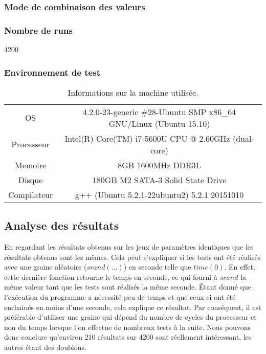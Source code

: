 \subsubsection{Mode de combinaison des valeurs}

\subsubsection{Nombre de runs}
4200
\subsubsection{Environnement de test}
\begin{table}[h!]
	\centering
	\caption{Informations sur la machine utilisée.}
	\label{tab:table1}
	\begin{tabular}{c|c}
		\toprule
		OS & 4.2.0-23-generic \#28-Ubuntu SMP x86\_64 GNU/Linux (Ubuntu 15.10)\\
		Processeur & Intel(R) Core(TM) i7-5600U CPU @ 2.60GHz (dual-core)\\
		Memoire & 8GB 1600MHz DDR3L\\
		Disque & 180GB M2 SATA-3 Solid State Drive\\
		Compilateur & g++ (Ubuntu 5.2.1-22ubuntu2) 5.2.1 20151010\\
		\bottomrule
	\end{tabular}
\end{table}

\subsection{Analyse des résultats}


En regardant les résultats obtenus sur les jeux de paramètres identiques que les résultats obtenus sont les mêmes. Cela peut s'expliquer si les tests ont été réalisés avec une graine aléatoire ($srand(...)$) en seconde telle que $time(0)$. En effet, cette dernière fonction retourne le temps en seconde, ce qui fourni à $srand$ la même valeur tant que les tests sont réalisés la même seconde. Étant donné que l'exécution du programme a nécessité peu de temps et que ceux-ci ont été enchainés en moins d'une seconde, cela explique ce résultat. Par conséquent, il est préférable d'utiliser une graine qui dépend du nombre de cycles du processeur et non du temps lorsque l'on effectue de nombreux tests à la suite. Nous pouvons donc conclure qu'environ 210 résultats sur 4200 sont réellement intéressant, les autres étant des doublons.
